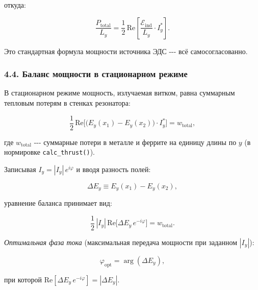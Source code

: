 \documentclass[11pt]{article}
\begin{document}
откуда:

\begin{equation*}
    \frac{P_{\mathrm{total}}}{L_y}
    = \frac{1}{2}\,\mathrm{Re}\!\left[
        \frac{\mathcal{E}_{\mathrm{ind}}}{L_y}\cdot I_y^*
      \right].
\end{equation*}

Это стандартная формула мощности источника ЭДС -\/-\/- всё
самосогласованно.

\subsubsection{4.4. Баланс мощности в стационарном
режиме}\label{ux431ux430ux43bux430ux43dux441-ux43cux43eux449ux43dux43eux441ux442ux438-ux432-ux441ux442ux430ux446ux438ux43eux43dux430ux440ux43dux43eux43c-ux440ux435ux436ux438ux43cux435}

В стационарном режиме мощность, излучаемая витком, равна суммарным
тепловым потерям в стенках резонатора:

\begin{equation}
    \frac{1}{2}\,\mathrm{Re}\bigl[
        \bigl(E_y(x_1) - E_y(x_2)\bigr)\cdot I_y^*
    \bigr]
    = w_{\mathrm{total}},
    \label{eq:balance}
\end{equation}

где \(w_{\mathrm{total}}\) -\/-\/- суммарные потери в металле и феррите
на единицу длины по \(y\) (в нормировке \texttt{calc\_thrust()}).

Записывая \(I_y = |I_y|\,e^{i\varphi}\) и вводя разность полей:

\begin{equation*}
    \Delta E_y \equiv E_y(x_1) - E_y(x_2),
\end{equation*}

уравнение баланса принимает вид:

\begin{equation*}
    \frac{1}{2}\,|I_y|\,\mathrm{Re}\bigl[\Delta E_y\,e^{-i\varphi}\bigr]
    = w_{\mathrm{total}}.
\end{equation*}

\emph{Оптимальная фаза тока} (максимальная передача мощности при
заданном \(|I_y|\)):

\begin{equation*}
    \varphi_{\mathrm{opt}} = \arg(\Delta E_y),
\end{equation*}

при которой \(\mathrm{Re}[\Delta E_y\,e^{-i\varphi}] = |\Delta E_y|\).
\end{document}
